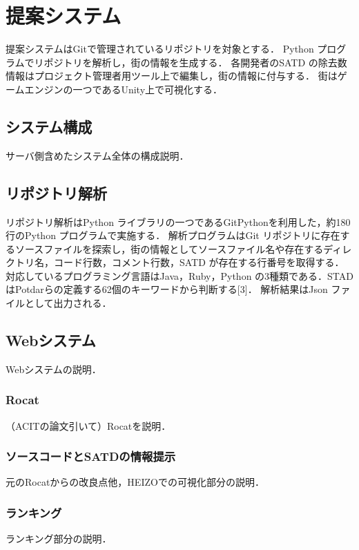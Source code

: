 \chapter{提案システム}
提案システムはGitで管理されているリポジトリを対象とする．
Python プログラムでリポジトリを解析し，街の情報を生成する．
各開発者のSATD の除去数情報はプロジェクト管理者用ツール上で編集し，街の情報に付与する．
街はゲームエンジンの一つであるUnity上で可視化する．

\section{システム構成}
サーバ側含めたシステム全体の構成説明．

\section{リポジトリ解析}
リポジトリ解析はPython ライブラリの一つであるGitPythonを利用した，約180 行のPython プログラムで実施する．
解析プログラムはGit リポジトリに存在するソースファイルを探索し，街の情報としてソースファイル名や存在するディレクトリ名，コード行数，コメント行数，SATD が存在する行番号を取得する．
対応しているプログラミング言語はJava，Ruby，Python の3種類である．STAD はPotdarらの定義する62個のキーワードから判断する[3]．
解析結果はJson ファイルとして出力される．

\section{Webシステム}
Webシステムの説明．

\subsection{Rocat}
（ACITの論文引いて）Rocatを説明．

\subsection{ソースコードとSATDの情報提示}
元のRocatからの改良点他，HEIZOでの可視化部分の説明．

\subsection{ランキング}
ランキング部分の説明．